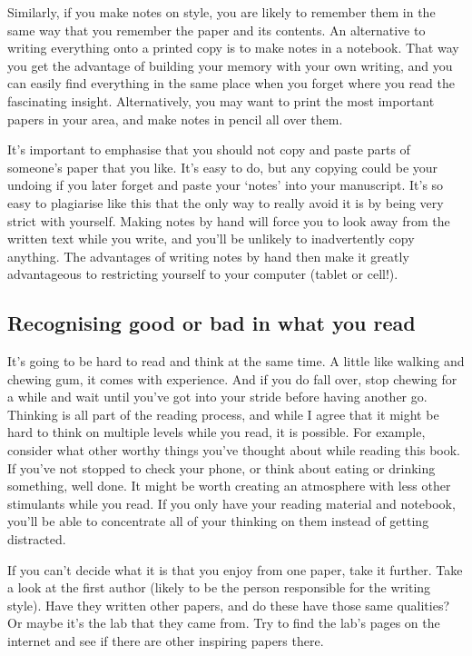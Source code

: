 \documentclass[
]{krantz}
\begin{document}
Similarly, if you make notes on style, you are likely to remember them in the same way that you remember the paper and its contents. An alternative to writing everything onto a printed copy is to make notes in a notebook. That way you get the advantage of building your memory with your own writing, and you can easily find everything in the same place when you forget where you read the fascinating insight. Alternatively, you may want to print the most important papers in your area, and make notes in pencil all over them.

It's important to emphasise that you should not copy and paste parts of someone's paper that you like. It's easy to do, but any copying could be your undoing if you later forget and paste your `notes' into your manuscript. It's so easy to plagiarise like this that the only way to really avoid it is by being very strict with yourself. Making notes by hand will force you to look away from the written text while you write, and you'll be unlikely to inadvertently copy anything. The advantages of writing notes by hand then make it greatly advantageous to restricting yourself to your computer (tablet or cell!).

\hypertarget{recognising-good-or-bad-in-what-you-read}{%
\subsection{Recognising good or bad in what you read}\label{recognising-good-or-bad-in-what-you-read}}

It's going to be hard to read and think at the same time. A little like walking and chewing gum, it comes with experience. And if you do fall over, stop chewing for a while and wait until you've got into your stride before having another go. Thinking is all part of the reading process, and while I agree that it might be hard to think on multiple levels while you read, it is possible. For example, consider what other worthy things you've thought about while reading this book. If you've not stopped to check your phone, or think about eating or drinking something, well done. It might be worth creating an atmosphere with less other stimulants while you read. If you only have your reading material and notebook, you'll be able to concentrate all of your thinking on them instead of getting distracted.

If you can't decide what it is that you enjoy from one paper, take it further. Take a look at the first author (likely to be the person responsible for the writing style). Have they written other papers, and do these have those same qualities? Or maybe it's the lab that they came from. Try to find the lab's pages on the internet and see if there are other inspiring papers there.
\end{document}
